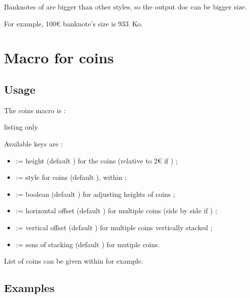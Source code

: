 \documentclass[11pt,a4paper]{ltxdoc}
\begin{document}
Banknotes of  are bigger than other styles, so the output doc can be bigger size.

For example, 100€ banknote's size is 933~Ko.

\section{Macro for coins}

\subsection{Usage}

The coins macro is :

\begin{DemoCode}{listing only}
\end{DemoCode}

Available keys are :

\begin{itemize}
	\item {} := height (default \MontreCode{2cm}) for the coins (relative to 2€ if ) ;
	\item {} := style for coins (default ), within  ;
	\item {} := boolean (default ) for adjusting heights of coins ;
	\item {} := horizontal offset (default \MontreCode{0pt}) for multiple coins (side by side if \MontreCode{0pt}) ;
	\item {} := vertical offset (default \MontreCode{5mm}) for multiple coins vertically stacked ;
	\item {} := sens of stacking (default ) for mutiple coins.
\end{itemize}

List of coins can be given within  for example.

\subsection{Examples}

\begin{DemoCode}{}
%
\end{DemoCode}
\end{document}
